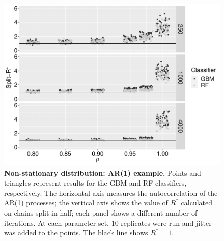 \documentclass[ba]{imsart}
\numberwithin{equation}{section}
\theoremstyle{plain}
\begin{document}
\begin{supplement}
		\begin{figure}[!htb]
			\centerline{\includegraphics[width=1.0\textwidth]{trends_ar1.pdf}}
			\caption{\textbf{Non-stationary distribution: AR(1) example.} Points and triangles represent results for the GBM and RF classifiers, respectively. The horizontal axis measures the autocorrelation of the AR(1) processes; the vertical axis shows the value of $R^*$ calculated on chains split in half; each panel shows a different number of iterations. At each parameter set, 10 replicates were run and jitter was added to the points. The black line shows $R^*=1$.}
			\label{fig:trends_ar1}
		\end{figure}
		

\end{supplement}
\end{document}
